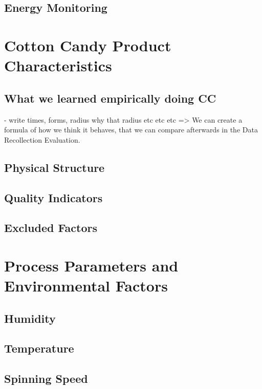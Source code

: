 \subsection{Energy Monitoring}

\section{Cotton Candy Product Characteristics}
\subsection{What we learned empirically doing CC}
    - write times, forms, radius why that radius etc etc etc
    => We can create a formula of how we think it behaves, that we can compare afterwards in the Data Recollection Evaluation.
\subsection{Physical Structure}

\subsection{Quality Indicators}

\subsection{Excluded Factors}

\section{Process Parameters and Environmental Factors}
\subsection{Humidity}

\subsection{Temperature}

\subsection{Spinning Speed}

